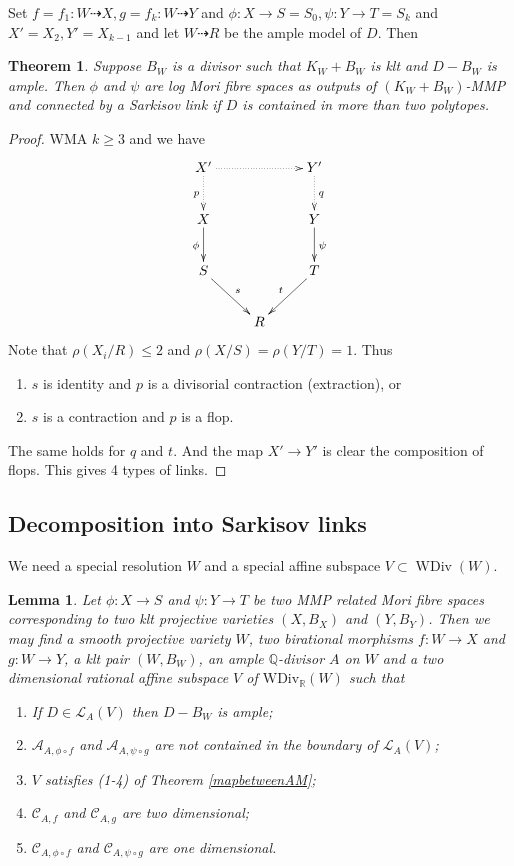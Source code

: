 \documentclass[11pt]{amsart}
\numberwithin{equation}{section}
\newtheorem{lem}[defn]{Lemma}
\newtheorem{thm}[defn]{Theorem}
\begin{document}
Set $ f=f_1:W\dashrightarrow X, g=f_k:W\dashrightarrow Y $ and $ \phi:X\to S=S_0,\psi:Y\to T=S_k $ and $ X'=X_2,Y'=X_{k-1} $ and let $ W\dashrightarrow R $ be the ample model of $ D $. Then
\begin{thm}\label{constructlink}
  \cite[Theorem 3.7]{haconSarkisovProgram2012} Suppose $ B_W $ is a divisor such that $ K_W+B_W $ is klt and $ D-B_W $ is ample. Then $ \phi $ and $ \psi $ are log Mori fibre spaces as outputs of $ (K_W+B_W) $-MMP and connected by a Sarkisov link if $ D $ is contained in more than two polytopes.
\end{thm}
\begin{proof}
  WMA $ k\geqslant 3 $ and we have 
  $$ \xymatrix{
  X'\ar@{.>}[d]_p\ar@{.>}[rr]&&Y'\ar@{.>}[d]^q\\
  X\ar[d]_{\phi}&&Y\ar[d]^\psi\\
  S\ar[rd]^s&&T\ar[ld]_t\\
  &R&} $$
Note that $ \rho(X_i/R)\leqslant 2 $ and $ \rho(X/S)=\rho(Y/T)=1 $. Thus 
\begin{enumerate}
  \item $ s $ is identity and $ p $ is a divisorial contraction (extraction), or
  \item $ s $ is a contraction and $ p $ is a flop.
\end{enumerate}
The same holds for $ q $ and $ t $. And the map $X'\to Y'$ is clear the composition of flops. This gives 4 types of links.
\end{proof}
\subsection{Decomposition into Sarkisov links}
We need a special resolution $W$ and a special  affine subspace $V \subset \operatorname{WDiv}(W)$.
\begin{lem}\label{keylemma}
  \cite[Lemma 4.1]{haconSarkisovProgram2012} Let $ \phi:X\to S $ and $ \psi :Y\to T  $ be two MMP related Mori fibre spaces corresponding to two klt projective varieties $ (X,B_X) $ and $ (Y,B_Y) $. Then we may find a smooth projective variety $ W $, two birational morphisms $ f:W\to X $ and $ g:W\to Y $, a klt pair $ (W,B_{W}) $, an ample $ \mathbb{Q} $-divisor $ A $ on $ W $ and a two dimensional rational affine subspace $ V $ of $ \mathrm{WDiv}_\mathbb{R}(W) $ such that 
  \begin{enumerate}
    \item If $ D\in \mathcal{L}_A(V) $ then $ D-B_W $ is ample;
    \item $ \mathcal{A}_{A,\phi\circ f} $ and $ \mathcal{A}_{A,\psi\circ g} $ are not contained in the boundary of $ \mathcal{L}_A(V) $;
    \item $ V $ satisfies (1-4) of Theorem \ref{mapbetweenAM};
    \item $ \mathcal{C}_{A,f} $ and $ \mathcal{C}_{A,g} $ are two dimensional;
    \item $ \mathcal{C}_{A,\phi\circ f} $ and $ \mathcal{C}_{A,\psi\circ g} $ are one dimensional.
  \end{enumerate}
\end{lem}
\end{document}
